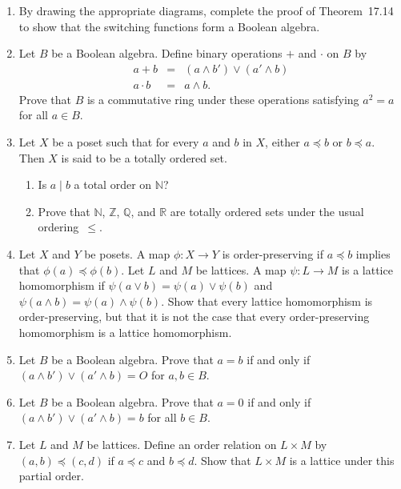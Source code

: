 {\begin{enumerate}
\begin{enumerate}
\end{enumerate}
 
 
\bf\item\rm 
By drawing the appropriate diagrams, complete the proof of
Theorem~17.14 to show that the switching functions form a Boolean
algebra. 
 
 
\bf\item\rm
Let $B$ be a Boolean algebra. Define binary operations $+$ and
$\cdot$ on $B$ by
\begin{eqnarray*}
a + b & = & (a \wedge b') \vee (a' \wedge b) \\
a \cdot b & = & a \wedge b.
\end{eqnarray*}
Prove that $B$ is a commutative ring under these operations
satisfying $a^2 = a$ for all $a \in B$.
 
 
\bf\item\rm
Let $X$  be a poset such that for every $a$ and $b$ in $X$, either $a
\preceq  b$ or $b \preceq a$. Then $X$ is said to be a {\bfi totally
ordered set}.
\begin{enumerate}			

 \bf\item\rm
Is $a \mid b$ a total order on ${\mathbb N}$?
 
 \bf\item\rm
Prove that ${\mathbb N}$, ${\mathbb Z}$, ${\mathbb Q}$, and ${\mathbb R}$ are
totally ordered sets under the usual ordering~$\leq$.
 
 
\end{enumerate}
 
 
\bf\item\rm
Let $X$ and $Y$ be posets.  A map $\phi : X \rightarrow Y$ is {\bfi
order-preserving\/} if $a \preceq b$
implies that $\phi(a) \preceq \phi(b)$.  Let $L$ and $M$ be lattices.
A map $\psi: L \rightarrow M$ is a {\bfi lattice
homomorphism\/}
if $\psi( a \vee b ) = \psi(a) \vee \psi(b)$ and $\psi( a \wedge b ) =
\psi(a) \wedge \psi(b)$. Show that every lattice homomorphism is
order-preserving, but that it is not the case that every
order-preserving homomorphism is a lattice homomorphism.  
 
 
\bf\item\rm
Let $B$ be a Boolean algebra. Prove that $a = b$ if and only if 
$(a \wedge b') \vee ( a' \wedge b) = O$ for $a, b \in B$.
 
\bf\item\rm
Let $B$ be a Boolean algebra. Prove that $a = 0$ if and only if 
$(a \wedge b') \vee ( a' \wedge b) = b$ for all $b \in B$.
 
\bf\item\rm
Let $L$ and $M$ be lattices. Define an order relation on $L \times M$
by $( a, b) \preceq (c, d)$ if $a \preceq c$ and $b \preceq d$. Show
that $L \times M$ is a lattice under this partial order.
 
\end{enumerate}
 
 
 
}
 
